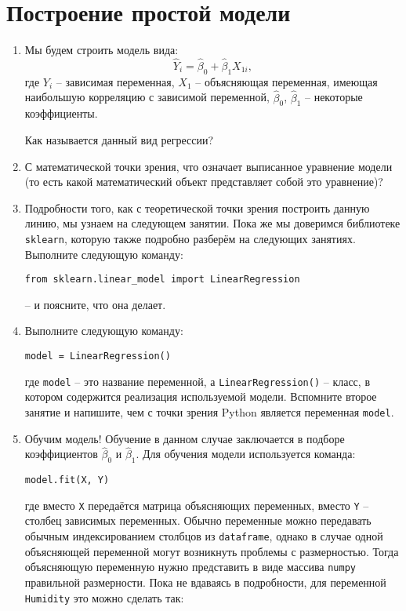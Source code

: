 \documentclass[11pt, a4paper]{extarticle}
\begin{document}
\section{Построение простой модели}
\begin{enumerate}
	\item Мы будем строить модель вида:
	\[
	\hat{Y}_i = \hat{\beta}_0 + \hat{\beta}_1X_{1i},
	\]
	где $Y_i$ – зависимая переменная, $X_1$ – объясняющая переменная, имеющая наибольшую корреляцию с зависимой переменной, $\hat{\beta}_0$, $\hat{\beta}_1$ – некоторые коэффициенты.
	
	Как называется данный вид регрессии?
	
	\item С математической точки зрения, что означает выписанное уравнение модели (то есть какой математический объект представляет собой это уравнение)?
	\item Подробности того, как с теоретической точки зрения построить данную линию, мы узнаем на следующем занятии. Пока же мы доверимся библиотеке {\tt sklearn}, которую также подробно разберём на следующих занятиях. Выполните следующую команду:
	
	 {\tt from sklearn.linear\_model import LinearRegression}
	 
	  – и поясните, что она делает. 
	
	\item Выполните следующую команду: 
	
	{\tt model = LinearRegression()}
	
	 где {\tt model} – это название переменной, а {\tt LinearRegression()} – класс, в котором содержится реализация используемой модели. Вспомните второе занятие и напишите, чем с точки зрения Python является переменная {\tt model}.
	
	\item Обучим модель! Обучение в данном случае заключается в подборе коэффициентов  $\hat{\beta}_0$ и $\hat{\beta}_1$. Для обучения модели используется команда:
	
	 {\tt model.fit(X, Y)}
	 
	  где вместо {\tt X} передаётся матрица объясняющих переменных, вместо {\tt Y} – столбец зависимых переменных. Обычно переменные можно передавать обычным индексированием столбцов из {\tt dataframe}, однако в случае одной объясняющей переменной могут возникнуть проблемы с размерностью. Тогда объясняющую переменную нужно представить в виде массива {\tt numpy} правильной размерности. Пока не вдаваясь в подробности, для переменной {\tt Humidity} это можно сделать так: 
	  

\end{enumerate}
\end{document}
